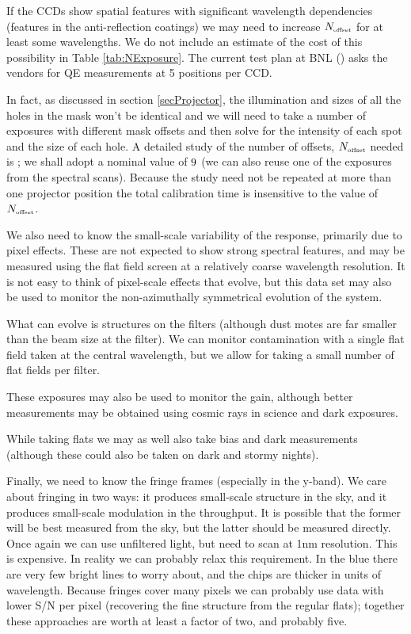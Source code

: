 If the CCDs show spatial features with significant wavelength dependencies (\eg features in the
anti-reflection coatings) we may need to increase $N_{\mbox{\tiny offset}}$ for at least some wavelengths.  We do not include
an estimate of the cost of this possibility in Table \ref{tab:NExposure}. The current test plan at BNL
(\cite{GilmoreCCDTesting})
asks the vendors for QE measurements at 5 positions per CCD.

In fact, as discussed in section \ref{secProjector}, the illumination and sizes of all the holes in the mask
won't be identical and we will need to take a number of exposures with different mask offsets and then solve
for the intensity of each spot and the size of each hole.  A detailed study of the number of offsets,
$N_{\mbox{\tiny offset}}$ needed is \TBD; we shall adopt a nominal value of $9$ (we can also reuse one of the
exposures from the spectral scans).  Because the study need not be repeated at more than one projector
position the total calibration time is insensitive to the value of $N_{\mbox{\tiny offset}}$.

We also need to know the small-scale variability of the response, primarily due to pixel effects.  These are
not expected to show strong spectral features, and may be measured using the flat field screen at a relatively
coarse wavelength resolution.  It is not easy to think of pixel-scale
effects that evolve, but this data set may also be used to monitor the non-azimuthally symmetrical
evolution of the system.

What can evolve is structures on the filters (although dust motes are far smaller than the beam
size at the filter).  We can monitor contamination with a single flat field taken at the central wavelength,
but we allow for taking a small number of flat fields per filter.

These exposures may also be used to monitor the gain, although better measurements may be obtained using
cosmic rays in science and dark exposures.

While taking flats we may as well also take bias and dark measurements (although these could also be taken on
dark and stormy nights).

Finally, we need to know the fringe frames (especially in the y-band).  We care about fringing in two ways: it
produces small-scale structure in the sky, and it produces small-scale modulation in the throughput. It is
possible that the former will be best measured from the sky, but the latter should be measured directly. Once
again we can use unfiltered light, but need to scan at 1nm resolution. This is expensive.  In reality we can
probably relax this requirement.  In the blue there are very few bright lines to worry about, and the chips
are thicker in units of wavelength.  Because fringes cover many pixels we can probably use data with lower S/N
per pixel (recovering the fine structure from the regular flats);  together these approaches are worth
at least a factor of two, and probably five.

